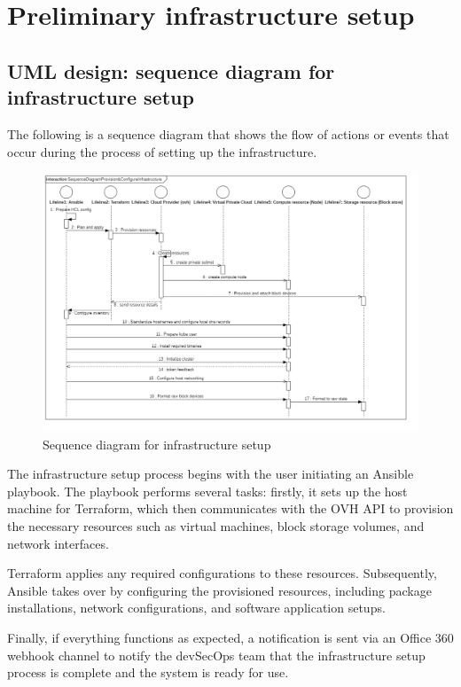 \section{Preliminary infrastructure setup}

\subsection{UML design: sequence diagram for infrastructure setup}

The following is a sequence diagram that shows the flow of actions or events that occur during the process of setting up the infrastructure.

\begin{figure}[H]\centering
\includegraphics[width=1.0\textwidth,angle=00]{assets/f16.png}
\caption{Sequence diagram for infrastructure setup}
\label{fig:Sequence diagram for infrastructure setup}
\end{figure}


The infrastructure setup process begins with the user initiating an Ansible playbook. The playbook performs several tasks: firstly, it sets up the host machine for Terraform, which then communicates with the OVH API to provision the necessary resources such as virtual machines, block storage volumes, and network interfaces.

Terraform applies any required configurations to these resources. Subsequently, Ansible takes over by configuring the provisioned resources, including package installations, network configurations, and software application setups.

Finally, if everything functions as expected, a notification is sent via an Office 360 webhook channel to notify the devSecOps team that the infrastructure setup process is complete and the system is ready for use.

